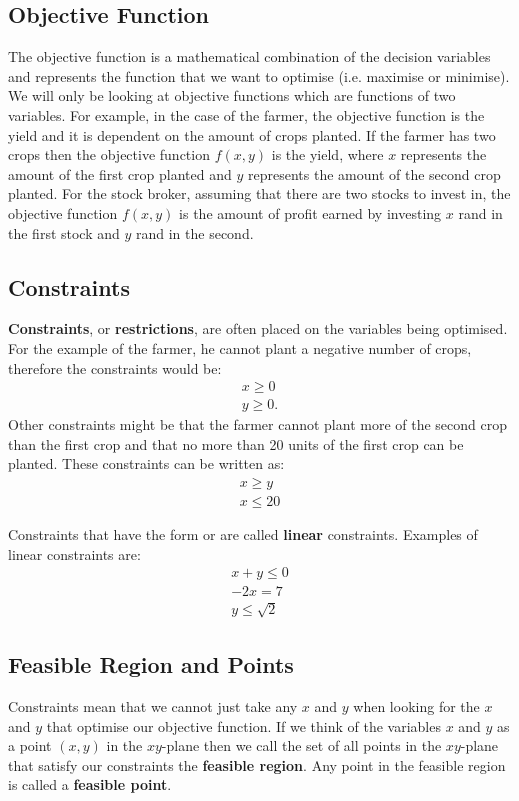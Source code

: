\subsection{Objective Function}
The objective function is a mathematical combination of the decision variables and represents the function that we want to optimise (i.e. maximise or minimise). We will only be looking at objective functions which are functions of two variables. For example, in the case of the farmer, the objective function is the yield and it is dependent on the amount of crops planted. If the farmer has two crops then the objective function $f(x,y)$ is the yield, where $x$ represents the amount of the first crop planted and $y$ represents the amount of the second crop planted. For the stock broker, assuming that there are two stocks to invest in, the objective function $f(x,y)$ is the amount of profit earned by investing $x$ rand in the first stock and $y$ rand in the second.

\subsection{Constraints}
\textbf{Constraints}, or \textbf{restrictions}, are often placed on the variables being optimised. For the example of the farmer, he cannot plant a negative number of crops, therefore the constraints would be:
\begin{eqnarray*}
x\geq 0\\
y\geq 0.
\end{eqnarray*}
Other constraints might be that the farmer cannot plant more of the second crop than the first crop and that no more than 20 units of the first crop can be planted. These constraints can be written as:
\begin{eqnarray*}
x\geq y\\
x\leq 20
\end{eqnarray*}

Constraints that have the form
or
are called \textbf{linear} constraints. Examples of linear constraints are:
\begin{eqnarray*}
x+y\leq 0\\
-2x=7\\
y\leq \sqrt{2}
\end{eqnarray*}

\subsection{Feasible Region and Points}
Constraints mean that we cannot just take any $x$ and $y$ when looking for the $x$ and $y$ that optimise our objective function. If we think of the variables $x$ and $y$ as a point $(x,y)$ in the $xy$-plane then we call the set of all points in the $xy$-plane that satisfy our constraints the \textbf{feasible region}. Any point in the feasible region is called a \textbf{feasible point}.

